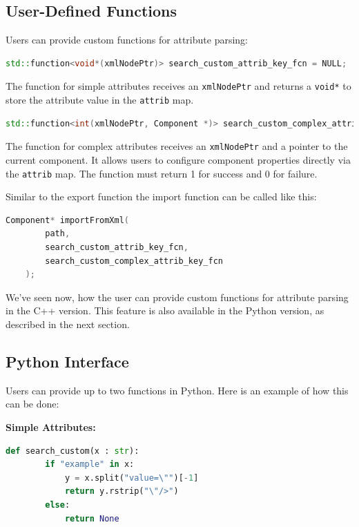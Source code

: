\subsection{User-Defined Functions}

Users can provide custom functions for attribute parsing:

    \begin{lstlisting}[language=C++, xleftmargin=4em, frame = single]
    std::function<void*(xmlNodePtr)> search_custom_attrib_key_fcn = NULL;
    \end{lstlisting}
    The function for simple attributes receives an \verb|xmlNodePtr| and returns a \verb|void*| to store the attribute value in the \verb|attrib| map.

    \begin{lstlisting}[language=C++, xleftmargin=4em, frame = single]
    std::function<int(xmlNodePtr, Component *)> search_custom_complex_attrib_key_fcn = NULL;
    \end{lstlisting}
    The function for complex attributes receives an \verb|xmlNodePtr| and a pointer to the current component. It allows users to configure component properties directly via the \verb|attrib| map. The function must return 1 for success and 0 for failure.

    Similar to the export function the import function can be called like this:

    \begin{lstlisting}[language=C++, xleftmargin=4em, frame = single]
    Component* importFromXml(
        path, 
        search_custom_attrib_key_fcn, 
        search_custom_complex_attrib_key_fcn
    );
    \end{lstlisting}

\smallskip
We've seen now, how the user can provide custom functions for attribute parsing in the C++ version. This feature is also available in the Python version, as described in the next section.

\subsection{Python Interface}

Users can provide up to two functions in Python. Here is an example of how this can be done:

\textbf{Simple Attributes:}
    \begin{lstlisting}[language=Python, xleftmargin=4em, frame = single]
    def search_custom(x : str):
        if "example" in x:
            y = x.split("value=\"")[-1]
            return y.rstrip("\"/>")
        else:
            return None
    \end{lstlisting}

